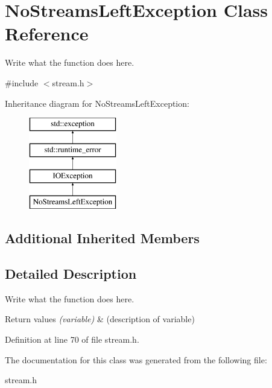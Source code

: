 \hypertarget{classNoStreamsLeftException}{\section{No\+Streams\+Left\+Exception Class Reference}
\label{classNoStreamsLeftException}
}


Write what the function does here.  




{\ttfamily \#include $<$stream.\+h$>$}

Inheritance diagram for No\+Streams\+Left\+Exception\+:\begin{figure}[H]
\begin{center}
\leavevmode
\includegraphics[height=4.000000cm]{classNoStreamsLeftException}
\end{center}
\end{figure}
\subsection*{Additional Inherited Members}


\subsection{Detailed Description}
Write what the function does here. 


\begin{DoxyRetVals}{Return values}
{\em (variable)} & (description of variable) \\
\hline
\end{DoxyRetVals}


Definition at line 70 of file stream.\+h.



The documentation for this class was generated from the following file\+:\begin{DoxyCompactItemize}
\item 
stream.\+h\end{DoxyCompactItemize}
